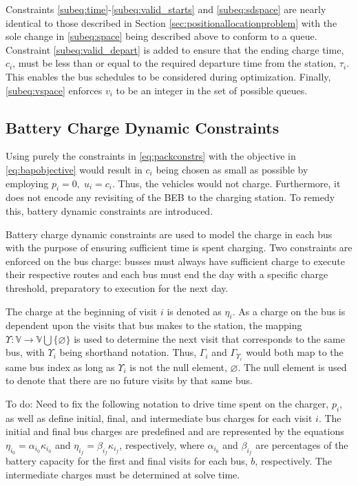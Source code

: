 \documentclass[utf8]{FrontiersinHarvard}
\newcommand{\TODO}[1]{{\color{green} To do: #1}}                                %
\begin{document}
Constraints \eqref{subeq:time}-\eqref{subeq:valid_starts} and \eqref{subeq:sdspace} are nearly identical to those described in Section \ref{sec:positionallocationproblem} with the sole change in \eqref{subeq:space} being described above to conform to a queue.  Constraint \eqref{subeq:valid_depart} is added to ensure that the ending charge time, $c_i$, must be less than
or equal to the required departure time from the station, $\tau_i$. This enables the bus schedules to be considered during optimization. Finally, \eqref{subeq:vspace} enforces $v_i$ to be an integer in the set of possible queues.

\subsection{Battery Charge Dynamic Constraints}
\label{sec:batt_dynamics}
Using purely the constraints in \eqref{eq:packconstrs} with the objective in \eqref{eq:bapobjective} would result in
$c_i$ being chosen as small as possible by employing $p_i = 0,\; u_i = c_i$. Thus, the vehicles would not charge.
Furthermore, it does not encode any revisiting of the BEB to the charging station. To remedy this, battery dynamic
constraints are introduced.

Battery charge dynamic constraints are used to model the charge in each bus with the purpose of ensuring sufficient time is spent charging. Two constraints are enforced on the bus charge: busses must always have sufficient charge to execute their respective routes and each bus must end the day with a specific charge threshold, preparatory to execution for the next day.

The charge at the beginning of visit $i$ is denoted as $\eta_i$. As a charge on the bus is dependent upon the visits that bus makes to the station, the mapping $\Upsilon: \mathbb{V} \rightarrow \mathbb{V} \bigcup \{\varnothing\}$ is used to determine the next visit that corresponds to the same bus, with $\Upsilon_i$ being shorthand notation. Thus, $\Gamma_i$ and $\Gamma_{\Upsilon_i}$ would both map to the same bus index as long as $\Upsilon_i$ is not the null element, $\varnothing$. The null element is used to denote that there are no future visits by that same bus.

\TODO{Need to fix the following notation}
to drive time spent on the charger, $p_i$, as well as define initial, final,
and intermediate bus charges for each visit $i$. The initial and final bus charges are predefined and are represented by
the equations $\eta_{i_0} = \alpha_{i_0} \kappa_{i_0}$ and $\eta_{i_f} = \beta_{i_f} \kappa_{i_f}$, respectively, where $\alpha_{i_0}$ and $\beta_{i_f}$
are percentages of the battery capacity for the first and final visits for each bus, $b$, respectively. The intermediate
charges must be determined at solve time.
\end{document}

